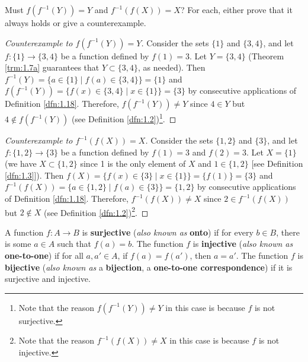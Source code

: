 \documentclass[../main.tex]{subfiles}
\begin{document}
\begin{exercise}\label{exr:1.19}
    Must $f(f^{-1}(Y))=Y$ and $f^{-1}(f(X))=X$? For each, either prove that it always holds or give a counterexample.
    \begin{proof}[Counterexample to $f(f^{-1}(Y))=Y$]
        Consider the sets $\{1\}$ and $\{3,4\}$, and let $f:\{1\}\to\{3,4\}$ be a function defined by $f(1)=3$. Let $Y=\{3,4\}$ (Theorem \ref{trm:1.7a} guarantees that $Y\subset\{3,4\}$, as needed). Then $f^{-1}(Y)=\{a\in\{1\}\mid f(a)\in\{3,4\}\}=\{1\}$ and $f(f^{-1}(Y))=\{f(x)\in\{3,4\}\mid x\in\{1\}\}=\{3\}$ by consecutive applications of Definition \ref{dfn:1.18}. Therefore, $f(f^{-1}(Y))\neq Y$ since $4\in Y$ but $4\notin f(f^{-1}(Y))$ (see Definition \ref{dfn:1.2})\footnote{Note that the reason $f(f^{-1}(Y))\neq Y$ in this case is because $f$ is not surjective.}.
    \end{proof}
    \begin{proof}[Counterexample to $f^{-1}(f(X))=X$]
        Consider the sets $\{1,2\}$ and $\{3\}$, and let $f:\{1,2\}\to\{3\}$ be a function defined by $f(1)=3$ and $f(2)=3$. Let $X=\{1\}$ (we have $X\subset\{1,2\}$ since 1 is the only element of $X$ and $1\in\{1,2\}$ [see Definition \ref{dfn:1.3}]). Then $f(X)=\{f(x)\in\{3\}\mid x\in\{1\}\}=\{f(1)\}=\{3\}$ and $f^{-1}(f(X))=\{a\in\{1,2\}\mid f(a)\in\{3\}\}=\{1,2\}$ by consecutive applications of Definition \ref{dfn:1.18}. Therefore, $f^{-1}(f(X))\neq X$ since $2\in f^{-1}(f(X))$ but $2\notin X$ (see Definition \ref{dfn:1.2})\footnote{Note that the reason $f^{-1}(f(X))\neq X$ in this case is because $f$ is not injective.}.
    \end{proof}
\end{exercise}

\begin{definition}\label{dfn:1.20}
    A function $f:A\to B$ is \textbf{surjective} (\emph{also known as} \textbf{onto}) if for every $b\in B$, there is some $a\in A$ such that $f(a)=b$. The function $f$ is \textbf{injective} (\emph{also known as} \textbf{one-to-one}) if for all $a,a'\in A$, if $f(a)=f(a')$, then $a=a'$. The function $f$ is \textbf{bijective} (\emph{also known as} a \textbf{bijection}, a \textbf{one-to-one correspondence}) if it is surjective and injective.
\end{definition}
\end{document}
